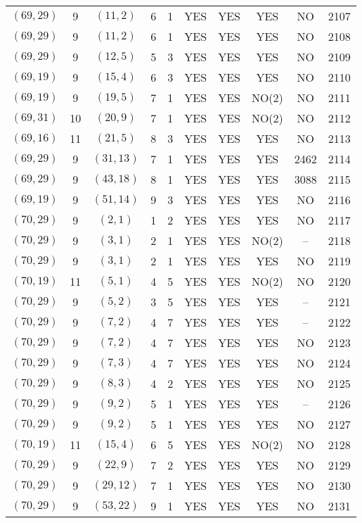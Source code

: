 \begin{longtable}{|c|c|c|c|c|c|c|c|c|c|}
$(69, 29)$ & 9 & $(11, 2)$ & 6 & 1 & YES & YES & YES & NO & 2107\\
$(69, 29)$ & 9 & $(11, 2)$ & 6 & 1 & YES & YES & YES & NO & 2108\\
$(69, 29)$ & 9 & $(12, 5)$ & 5 & 3 & YES & YES & YES & NO & 2109\\
$(69, 19)$ & 9 & $(15, 4)$ & 6 & 3 & YES & YES & YES & NO & 2110\\
$(69, 19)$ & 9 & $(19, 5)$ & 7 & 1 & YES & YES & NO(2) & NO & 2111\\
$(69, 31)$ & 10 & $(20, 9)$ & 7 & 1 & YES & YES & NO(2) & NO & 2112\\
$(69, 16)$ & 11 & $(21, 5)$ & 8 & 3 & YES & YES & YES & NO & 2113\\
$(69, 29)$ & 9 & $(31, 13)$ & 7 & 1 & YES & YES & YES & 2462 & 2114\\
$(69, 29)$ & 9 & $(43, 18)$ & 8 & 1 & YES & YES & YES & 3088 & 2115\\
$(69, 19)$ & 9 & $(51, 14)$ & 9 & 3 & YES & YES & YES & NO & 2116\\
$(70, 29)$ & 9 & $(2, 1)$ & 1 & 2 & YES & YES & YES & NO & 2117\\
$(70, 29)$ & 9 & $(3, 1)$ & 2 & 1 & YES & YES & NO(2) & -- & 2118\\
$(70, 29)$ & 9 & $(3, 1)$ & 2 & 1 & YES & YES & YES & NO & 2119\\
$(70, 19)$ & 11 & $(5, 1)$ & 4 & 5 & YES & YES & NO(2) & NO & 2120\\
$(70, 29)$ & 9 & $(5, 2)$ & 3 & 5 & YES & YES & YES & -- & 2121\\
$(70, 29)$ & 9 & $(7, 2)$ & 4 & 7 & YES & YES & YES & -- & 2122\\
$(70, 29)$ & 9 & $(7, 2)$ & 4 & 7 & YES & YES & YES & NO & 2123\\
$(70, 29)$ & 9 & $(7, 3)$ & 4 & 7 & YES & YES & YES & NO & 2124\\
$(70, 29)$ & 9 & $(8, 3)$ & 4 & 2 & YES & YES & YES & NO & 2125\\
$(70, 29)$ & 9 & $(9, 2)$ & 5 & 1 & YES & YES & YES & -- & 2126\\
$(70, 29)$ & 9 & $(9, 2)$ & 5 & 1 & YES & YES & YES & NO & 2127\\
$(70, 19)$ & 11 & $(15, 4)$ & 6 & 5 & YES & YES & NO(2) & NO & 2128\\
$(70, 29)$ & 9 & $(22, 9)$ & 7 & 2 & YES & YES & YES & NO & 2129\\
$(70, 29)$ & 9 & $(29, 12)$ & 7 & 1 & YES & YES & YES & NO & 2130\\
$(70, 29)$ & 9 & $(53, 22)$ & 9 & 1 & YES & YES & YES & NO & 2131\\

\end{longtable}
